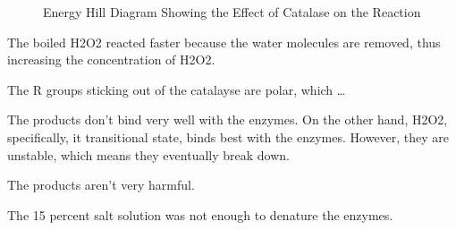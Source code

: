 \documentclass[12pt]{article}
\begin{document}
\begin{enumAlph}
\begin{figure}[h]
        \caption{Energy Hill Diagram Showing the Effect of Catalase on the Reaction}
        \label{fig:energy_hill}
    \end{figure}
\end{enumAlph}

The boiled H2O2 reacted faster because the water molecules
are removed, thus increasing the concentration of H2O2. 

The R groups sticking out of the catalayse 
are polar, which \dots 

The products don't bind very well with the enzymes. On 
the other hand, H2O2, specifically, it transitional
state, binds best with the enzymes. However, they are 
unstable, which means they eventually break down.

The products aren't very harmful. 

The 15 percent salt solution was not enough to denature the 
enzymes. 
\end{document}
